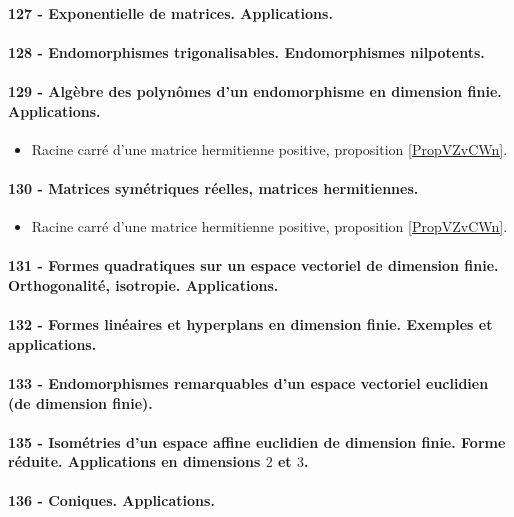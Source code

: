 \paragraph{127 - Exponentielle de matrices. Applications.}
\paragraph{128 - Endomorphismes trigonalisables. Endomorphismes nilpotents.}
\paragraph{129 - Algèbre des polynômes d’un endomorphisme en dimension finie. Applications.}
\begin{itemize}
    \item Racine carré d'une matrice hermitienne positive, proposition \ref{PropVZvCWn}.
\end{itemize}
\paragraph{130 - Matrices symétriques réelles, matrices hermitiennes.}
\begin{itemize}
    \item Racine carré d'une matrice hermitienne positive, proposition \ref{PropVZvCWn}.
\end{itemize}
\paragraph{131 - Formes quadratiques sur un espace vectoriel de dimension finie. Orthogonalité, isotropie. Applications.}
\paragraph{132 - Formes linéaires et hyperplans en dimension finie. Exemples et applications.}
\paragraph{133 - Endomorphismes remarquables d’un espace vectoriel euclidien (de dimension finie).}
\paragraph{135 - Isométries d’un espace affine euclidien de dimension finie. Forme réduite. Applications en dimensions $2$ et $3$.}
\paragraph{136 - Coniques. Applications.}
